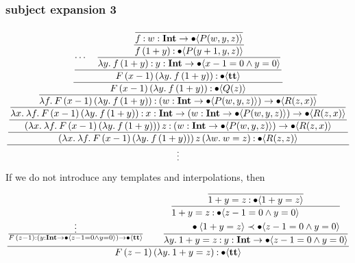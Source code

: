 \documentclass{article}
\begin{document}
\subsubsection{subject expansion 3}
\begin{equation*}
    \dfrac{
        \dfrac{
            \dfrac{
                \dfrac{
                    \dfrac{
                        \dfrac{
                            \dfrac{
                                \cdots
                                \quad
                                \dfrac{
                                    \dfrac{
                                        \dfrac{}{
                                            f \mathbin{:} {w} : \textbf{Int} \to \bullet \langle P(w, y, z) \rangle
                                        }
                                    }{
                                        f\,(1+y) \mathbin{:} \bullet \langle P(y+1, y, z) \rangle
                                    }
                                } {
                                    \lambda y.\: f\,(1+y) \mathbin{:} {y} : \textbf{Int} \to \bullet \langle x - 1 = 0 \wedge y = 0 \rangle
                                }
                            }{
                                F\, (x-1)\, (\lambda y.\: f\,(1+y))  \mathbin{:} \bullet \langle \textbf{tt} \rangle
                            }
                        }{
                            F\, (x-1)\, (\lambda y.\: f\,(1+y))  \mathbin{:} \bullet \langle Q(z) \rangle
                        }
                    }{
                        \lambda f.\: F\, (x-1)\, (\lambda y.\: f\,(1+y)) \mathbin{:} ({w} : \textbf{Int} \to \bullet \langle P(w, y, z) \rangle) \to \bullet \langle R(z, x) \rangle
                    }
                } {
                    \lambda x.\: \lambda f.\: F\, (x-1)\, (\lambda y.\: f\,(1+y)) \mathbin{:} {x} : \textbf{Int} \to ({w} : \textbf{Int} \to \bullet \langle P(w, y, z) \rangle) \to \bullet \langle R(z, x) \rangle
                }
            }{
                (\lambda x.\: \lambda f.\: F\, (x-1)\, (\lambda y.\: f\,(1+y)))\, z \mathbin{:} ({w} : \textbf{Int} \to \bullet \langle P(w, y, z) \rangle) \to \bullet \langle R(z, x) \rangle
            }
        }{
            (\lambda x.\: \lambda f.\: F\, (x-1)\, (\lambda y.\: f\,(1+y)))\, z\, (\lambda w.\: w = z) \mathbin{:} \bullet \langle R(z, z) \rangle
        }
    }{
        \vdots
    }
\end{equation*}

If we do not introduce any templates and interpolations, then
\begin{equation*}
    \dfrac{
        \frac{
            \vdots
        }{
            F\, (z-1) \mathbin{:} ({y} : \textbf{Int} \to \bullet \langle z-1 = 0 \wedge y = 0 \rangle) \to \bullet \langle \textbf{tt} \rangle
        }
        \qquad
        \dfrac{
            \dfrac{
                \dfrac{
                }{
                    1 + y = z \mathbin{:} \bullet \langle 1 + y = z \rangle
                }
            }{
                \begin{aligned}
                    &1 + y = z \mathbin{:} \bullet \langle z-1 = 0 \wedge y = 0 \rangle \\
                    &\qquad \bullet \langle 1 + y = z \rangle \prec \bullet \langle z-1 = 0 \wedge y = 0 \rangle
                \end{aligned}
            }
        }{
            \lambda y.\: 1+y = z \mathbin{:} {y} : \textbf{Int} \to \bullet \langle z-1 = 0 \wedge y = 0 \rangle
        }
    }{
        F\, (z-1)\, (\lambda y.\: 1+y = z) \mathbin{:} \bullet \langle \textbf{tt} \rangle
    }
\end{equation*}
\end{document}
